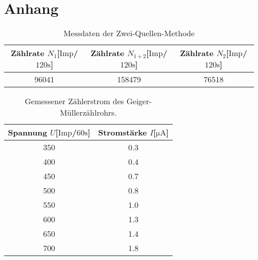 \section{Anhang}

\begin{table}
\centering
\caption{Messdaten der Zwei-Quellen-Methode}
\label{tab:ogemessdaten3}
\begin{tabular}{c c c}
    \toprule
    Zählrate $N_{1}$[$\text{Imp}$/$120\si{\second}$] & Zählrate $N_{1+2}$[$\text{Imp}$/$120\si{\second}$] & Zählrate $N_{2}$[$\text{Imp}$/$120\si{\second}$]\\
    \midrule
    96041 & 158479 & 76518 \\
    \bottomrule
\end{tabular}
\end{table}

\begin{table}
\centering
\caption{Gemessener Zählerstrom des Geiger-Müllerzählrohrs.}
\label{tab:ogemessdaten2}
\begin{tabular}{c c}
    \toprule
    Spannung $U$[$\text{Imp}$/$60\si{\second}$] & Stromstärke $I$[$\si{\micro\ampere}$]\\
    \midrule
    350   & 0.3 \\
    400	  & 0.4 \\
    450	  & 0.7 \\
    500	  & 0.8 \\
    550	  & 1.0 \\
    600	  & 1.3 \\
    650	  & 1.4 \\
    700	  & 1.8 \\
    \bottomrule
\end{tabular}
\end{table}

